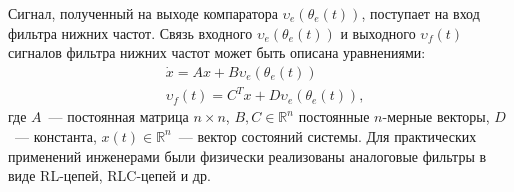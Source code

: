 \documentclass[a4paper,article,14pt]{extarticle}
\begin{document}
Сигнал, полученный на выходе компаратора $\upsilon_e(\theta_e(t))$, поступает на вход фильтра нижних частот. Связь входного $\upsilon_e(\theta_e(t))$ и выходного $\upsilon_f(t)$ сигналов фильтра нижних частот может быть описана уравнениями:
 \begin{equation}\label{linear_block_eq}
 \begin{aligned}
&\dot{x} = Ax + B\upsilon_e(\theta_e(t))\\
&\upsilon_f(t) = C^Tx + D\upsilon_e(\theta_e(t)),
 \end{aligned}
\end{equation}
где $A$~--- постоянная матрица $n \times n$, $B, C \in \mathbb{R}^n$  постоянные $n$-мерные векторы, $D$~--- константа, $x(t) \in \mathbb{R}^n$~--- вектор состояний системы. Для практических применений инженерами были физически реализованы аналоговые фильтры в виде RL-цепей, RLC-цепей и др.
\end{document}
